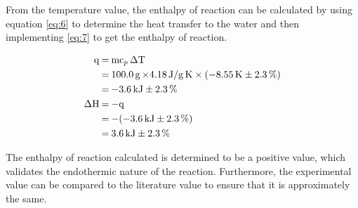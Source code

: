 \documentclass{article}
\begin{document}
\noindent
From the temperature value, the enthalpy of reaction can be calculated by using equation \ref{eq:6} to determine the heat transfer to the water and then implementing \ref{eq:7} to get the enthalpy of reaction.
\begin{tcolorbox}[title=Calculation of Enthalpy of Reaction ($\ce{\Delta H}$)]
\begin{equation}
    \begin{split}
        \ce{
        q &= mc_p \Delta T \\ 
        &= 100.0 \si{g} \times} \ce{4.18 \si{J/g.K}\times (-8.55 K \pm 2.3 \%) \\
        &= -3.6 kJ \pm 2.3\% \\
        \Delta H &= -q \\ 
        &= -(-3.6 kJ \pm 2.3\%) \\ 
        &= 3.6 kJ \pm 2.3\%
        }
    \end{split}
\end{equation}
\end{tcolorbox}
\noindent
The enthalpy of reaction calculated is determined to be a positive value, which validates the endothermic nature of the reaction. Furthermore, the experimental value can be compared to the literature value to ensure that it is approximately the same. \\ \\
\end{document}
